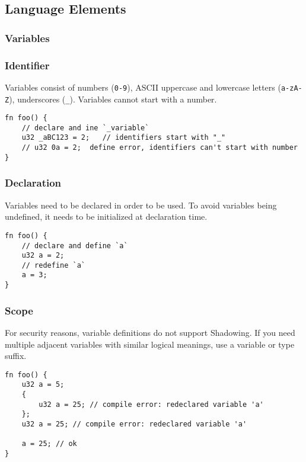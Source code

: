 \subsection{Language Elements}\label{section: ola-lang-language-elements}


\subsubsection{Variables}

\subsubsection*{Identifier}

Variables consist of numbers (\texttt{0-9}), ASCII uppercase and lowercase letters (\texttt{a-zA-Z}), underscores (\texttt{\_}).
Variables cannot start with a number.

\begin{lstlisting}
fn foo() {
    // declare and ine `_variable`
    u32 _aBC123 = 2;   // identifiers start with "_"
    // u32 0a = 2;  define error, identifiers can't start with number
}
\end{lstlisting}

\subsubsection*{Declaration}

Variables need to be declared in order to be used. To avoid variables being undefined, it needs to be initialized at declaration time. 

\begin{lstlisting}
fn foo() {
    // declare and define `a`
    u32 a = 2;
    // redefine `a`
    a = 3;
}
\end{lstlisting}

\subsubsection*{Scope}

For security reasons, variable definitions do not support Shadowing. 
If you need multiple adjacent variables with similar logical meanings, use a variable or type suffix.

\begin{lstlisting}
fn foo() {
    u32 a = 5;
    {        
        u32 a = 25; // compile error: redeclared variable 'a'
    };    
    u32 a = 25; // compile error: redeclared variable 'a'

    a = 25; // ok
}
\end{lstlisting}

